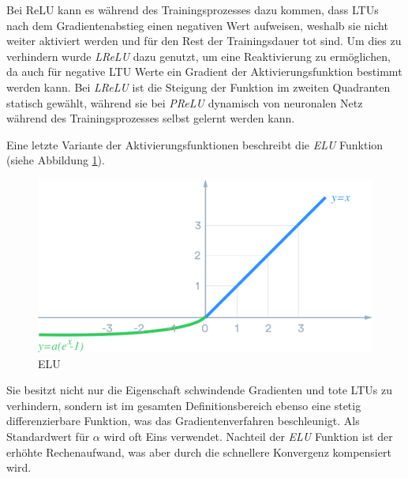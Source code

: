 Bei ReLU kann es während des Trainingsprozesses dazu kommen, dass LTUs nach dem Gradientenabstieg einen negativen Wert aufweisen, weshalb sie nicht weiter aktiviert werden und für den Rest der Trainingsdauer \glqq tot\grqq{} sind. Um dies zu verhindern wurde \textit{LReLU} dazu genutzt, um eine Reaktivierung zu ermöglichen, da auch für negative LTU Werte ein Gradient der Aktivierungsfunktion bestimmt werden kann. Bei \textit{LReLU} ist die Steigung der Funktion im zweiten Quadranten statisch gewählt, während sie bei \textit{PReLU} dynamisch von neuronalen Netz während des Trainingsprozesses selbst gelernt werden kann. \cite[S. 280 f.]{AurelienGeron.2018}

Eine letzte Variante der Aktivierungsfunktionen beschreibt die \textit{ELU} Funktion (siehe Abbildung \ref{elu}).

\begin{figure}[ht]
	\begin{center}
		\includegraphics[width=16cm]{Bilder/elu.png} 
		\caption[ELU]{ELU \cite{DanqingLiu.20171130}}
		\label{elu}
	\end{center}
\end{figure}

Sie besitzt nicht nur die Eigenschaft schwindende Gradienten und tote LTUs zu verhindern, sondern ist im gesamten Definitionsbereich ebenso eine stetig differenzierbare Funktion, was das Gradientenverfahren beschleunigt. Als Standardwert für $\alpha$ wird oft Eins verwendet. Nachteil der \textit{ELU} Funktion ist der erhöhte Rechenaufwand, was aber durch die schnellere Konvergenz kompensiert wird. \cite[S. 280 f.]{AurelienGeron.2018}
